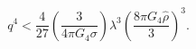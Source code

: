 \begin{equation}
q^4<\frac{4}{27}\left(\frac{3}{4\pi G_4 \sigma}\right)
\lambda^3\left(\frac{8\pi G_4\hat{\rho}}{3}\right)^3.
\label{con-flat}\end{equation}

